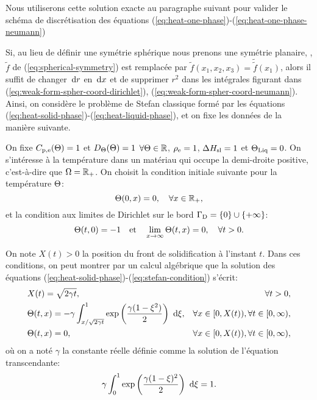 Nous utiliserons cette solution exacte au paragraphe suivant pour
valider le schéma de discrétisation des équations
(\ref{eq:heat-one-phase})-(\ref{eq:heat-one-phase-neumann})

Si, au lieu de définir une symétrie sphérique nous prenons une
symétrie planaire, \ie, $\tilde f$ de (\ref{eq:spherical-symmetry})
est remplacée par $\tilde f(x_1, x_2, x_3) = \tilde{\tilde f}(x_1)$,
alors il suffit de changer $\,\mathrm dr$ en $\,\mathrm dx$ et de supprimer
$r^2$ dans les intégrales figurant dans
(\ref{eq:weak-form-spher-coord-dirichlet}),
(\ref{eq:weak-form-spher-coord-neumann}). Ainsi, on considère le
problème de Stefan classique formé par les équations
(\ref{eq:heat-solid-phase})-(\ref{eq:heat-liquid-phase}), et on fixe
les données de la manière suivante.


On fixe $C_{\mathrm{p,e}}(\Theta) = 1$ et
$D_\Theta(\Theta)=1$ $\forall\Theta \in \mathbb
R$, $\rho_\mathrm{e} = 1$, $\Delta H_\mathrm{sl} = 1$ et $\Theta_\text{Liq} =
0$. On s'intéresse à la température dans un matériau qui occupe la
demi-droite positive, c'est-à-dire que $\Omega = {\mathbb R_+}$. On choisit
la condition initiale suivante pour la température $\Theta$:
\begin{equation}
  \Theta(0, x) = 0, \quad \forall x\in{\mathbb R_+},
\end{equation}
et la condition aux limites de Dirichlet sur le bord $\Gamma_\mathrm{D} =
\left\{ 0 \right\}\cup \left\{ +\infty \right\}$:
\begin{equation}
  \Theta(t, 0) = -1 \quad\text{et}\quad
  \lim_{x\to\infty}\Theta(t, x) = 0, \quad \forall t > 0.
\end{equation}

On note $X(t) > 0$ la position du front de solidification à l'instant
$t$. Dans ces conditions, on peut montrer \cite{HillStefanProblems}
par un calcul algébrique que la solution des équations
(\ref{eq:heat-solid-phase})-(\ref{eq:stefan-condition}) s'écrit:
\begin{align}
  & X(t) = \sqrt{2\gamma t},& \forall t >
  0,\label{eq:neumann-sol-frontier}\\
  & \temperature(t, x) = -\gamma\int_{x / \sqrt{2\gamma
      t}}^1\exp\parent{\frac{\gamma(1 - \xi^2)}{2}}\, \intd{\xi},%
  & \forall x \in [0,X(t)),
    \forall t \in [0,\infty),\label{eq:neumann-sol-solid-phase}\\
  & \temperature(t, x) = 0,
  & \forall x \in [0,X(t)),
    \forall t \in [0,\infty),\label{eq:neumann-sol-liquid-phase}
\end{align}
où on a noté $\gamma$ la constante réelle définie comme la solution de
l'équation transcendante:
\begin{equation}
  \gamma \int_0^1\exp\left( \frac{\gamma(1 - \xi)^2}{2} \right)\,\,\mathrm d\xi
  = 1.
\end{equation}

